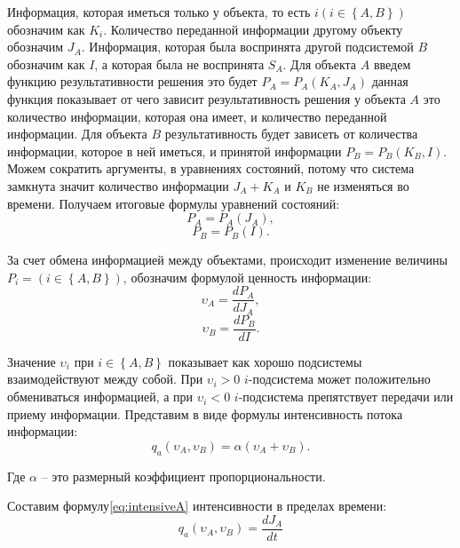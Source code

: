 Информация, которая иметься только у объекта, то есть  $i \left( i \in \left\{A,B \right\} \right)$ обозначим как $K_i$. Количество переданной информации другому объекту обозначим $J_A$. Информация, которая была воспринята другой подсистемой $B$ обозначим как $I$, а которая была не воспринята $S_A$. Для объекта $A$ введем функцию результативности решения это будет $P_A=P_A(K_A,J_A)$ данная функция показывает от чего зависит результативность решения у объекта $A$ 	это количество информации, которая она имеет, и количество переданной информации. Для объекта $B$ результативность будет зависеть от количества информации, которое в ней иметься, и принятой информации $P_B=P_B(K_B,I)$. 
Можем сократить аргументы, в уравнениях состояний, потому что система замкнута значит количество информации $J_A+K_A$ и $K_B$ не изменяться во времени. Получаем итоговые формулы уравнений состояний:
\begin{equation}\label{eq:sost1}
P_A=P_A(J_A),
\end{equation}
\begin{equation}\label{eq:sost2}
P_B=P_B(I). 
\end{equation}

За счет обмена информацией между объектами, происходит изменение величины $P_i = \left( i \in \left\{A,B \right\} \right)$, обозначим формулой ценность информации:
\begin{equation}\label{eq:cenoostinfo1}
\upsilon_A = \frac{dP_A}{dJ_A},
\end{equation}
\begin{equation}\label{eq:cenoostinfo2}
\upsilon_B = \frac{dP_B	}{dI}.
\end{equation}

Значение $\upsilon_i$ при $i \in \left\{A,B \right\}$ показывает как хорошо подсистемы взаимодействуют между собой. При $\upsilon_i > 0$ $i$-подсистема может положительно обмениваться информацией, а при $\upsilon_i < 0$ $i$-подсистема препятствует передачи или приему информации. Представим в виде формулы интенсивность потока информации:
\begin{equation}\label{eq:intensive}
q_a(\upsilon_A,\upsilon_B) = \alpha (\upsilon_A + \upsilon_B).
\end{equation}

Где $\alpha$ --  это размерный коэффициент пропорциональности.

Составим формулу\ref{eq:intensiveA} интенсивности в пределах времени:
\begin{equation}\label{eq:intensiveA}
q_a(\upsilon_A,\upsilon_B) = \frac{dJ_A}{dt}
\end{equation}

